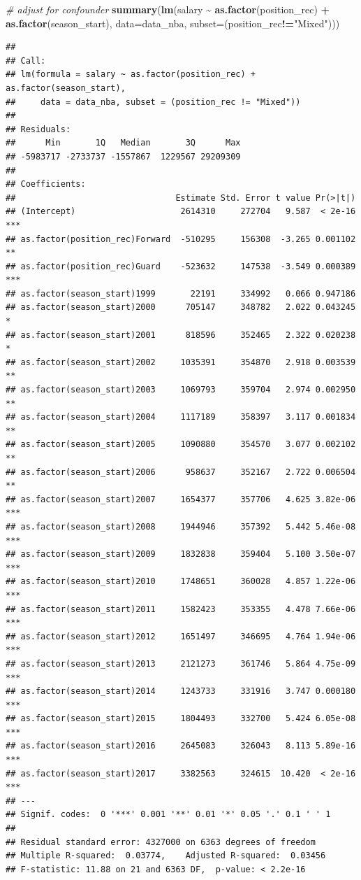 \documentclass[
]{book}
\newenvironment{Shaded}{\begin{snugshade}}{\end{snugshade}}
\newcommand{\AttributeTok}[1]{\textcolor[rgb]{0.13,0.29,0.53}{#1}}
\newcommand{\CommentTok}[1]{\textcolor[rgb]{0.56,0.35,0.01}{\textit{#1}}}
\newcommand{\FunctionTok}[1]{\textcolor[rgb]{0.13,0.29,0.53}{\textbf{#1}}}
\newcommand{\NormalTok}[1]{#1}
\newcommand{\SpecialCharTok}[1]{\textcolor[rgb]{0.81,0.36,0.00}{\textbf{#1}}}
\newcommand{\StringTok}[1]{\textcolor[rgb]{0.31,0.60,0.02}{#1}}
\begin{document}
\begin{Shaded}
\begin{Highlighting}[]
\CommentTok{\# adjust for confounder }
\FunctionTok{summary}\NormalTok{(}\FunctionTok{lm}\NormalTok{(salary }\SpecialCharTok{\textasciitilde{}} \FunctionTok{as.factor}\NormalTok{(position\_rec) }\SpecialCharTok{+} \FunctionTok{as.factor}\NormalTok{(season\_start), }\AttributeTok{data=}\NormalTok{data\_nba, }\AttributeTok{subset=}\NormalTok{(position\_rec}\SpecialCharTok{!=}\StringTok{"Mixed"}\NormalTok{)))}
\end{Highlighting}
\end{Shaded}

\begin{verbatim}
## 
## Call:
## lm(formula = salary ~ as.factor(position_rec) + as.factor(season_start), 
##     data = data_nba, subset = (position_rec != "Mixed"))
## 
## Residuals:
##      Min       1Q   Median       3Q      Max 
## -5983717 -2733737 -1557867  1229567 29209309 
## 
## Coefficients:
##                                Estimate Std. Error t value Pr(>|t|)    
## (Intercept)                     2614310     272704   9.587  < 2e-16 ***
## as.factor(position_rec)Forward  -510295     156308  -3.265 0.001102 ** 
## as.factor(position_rec)Guard    -523632     147538  -3.549 0.000389 ***
## as.factor(season_start)1999       22191     334992   0.066 0.947186    
## as.factor(season_start)2000      705147     348782   2.022 0.043245 *  
## as.factor(season_start)2001      818596     352465   2.322 0.020238 *  
## as.factor(season_start)2002     1035391     354870   2.918 0.003539 ** 
## as.factor(season_start)2003     1069793     359704   2.974 0.002950 ** 
## as.factor(season_start)2004     1117189     358397   3.117 0.001834 ** 
## as.factor(season_start)2005     1090880     354570   3.077 0.002102 ** 
## as.factor(season_start)2006      958637     352167   2.722 0.006504 ** 
## as.factor(season_start)2007     1654377     357706   4.625 3.82e-06 ***
## as.factor(season_start)2008     1944946     357392   5.442 5.46e-08 ***
## as.factor(season_start)2009     1832838     359404   5.100 3.50e-07 ***
## as.factor(season_start)2010     1748651     360028   4.857 1.22e-06 ***
## as.factor(season_start)2011     1582423     353355   4.478 7.66e-06 ***
## as.factor(season_start)2012     1651497     346695   4.764 1.94e-06 ***
## as.factor(season_start)2013     2121273     361746   5.864 4.75e-09 ***
## as.factor(season_start)2014     1243733     331916   3.747 0.000180 ***
## as.factor(season_start)2015     1804493     332700   5.424 6.05e-08 ***
## as.factor(season_start)2016     2645083     326043   8.113 5.89e-16 ***
## as.factor(season_start)2017     3382563     324615  10.420  < 2e-16 ***
## ---
## Signif. codes:  0 '***' 0.001 '**' 0.01 '*' 0.05 '.' 0.1 ' ' 1
## 
## Residual standard error: 4327000 on 6363 degrees of freedom
## Multiple R-squared:  0.03774,    Adjusted R-squared:  0.03456 
## F-statistic: 11.88 on 21 and 6363 DF,  p-value: < 2.2e-16
\end{verbatim}
\end{document}

